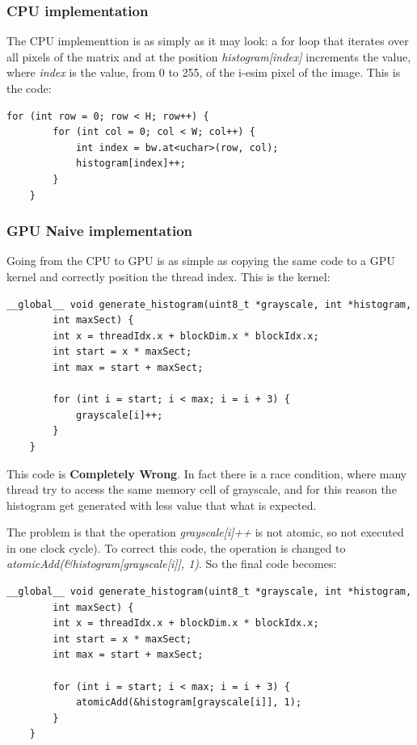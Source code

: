 \documentclass[paper=a4, fontsize=10pt]{scrartcl}	%
\begin{document}
	\subsubsection{CPU implementation}

	The CPU implementtion is as simply as it may look: a for loop that iterates over all pixels of the matrix and at the position \textit{histogram[index]} increments the value, where \textit{index} is the value, from 0 to 255, of the i-esim pixel of the image.
	This is the code:
	
	\begin{lstlisting}[style=CStyle]
	for (int row = 0; row < H; row++) {
		for (int col = 0; col < W; col++) {
			int index = bw.at<uchar>(row, col);
			histogram[index]++;
		}
	}
	\end{lstlisting}
	
	
	\subsubsection{GPU Naive implementation}
	
	Going from the CPU to GPU is as simple as copying the same code to a GPU kernel and correctly position the thread index. This is the kernel:
	
	\begin{lstlisting}[style=CStyle]
	__global__ void generate_histogram(uint8_t *grayscale, int *histogram, 
		int maxSect) {
		int x = threadIdx.x + blockDim.x * blockIdx.x;
		int start = x * maxSect;
		int max = start + maxSect;
	
		for (int i = start; i < max; i = i + 3) {
			grayscale[i]++;
		}
	}
	\end{lstlisting}

	This code is \textbf{Completely Wrong}. In fact there is a race condition, where many thread try to access the same memory cell of grayscale, and for this reason the histogram get generated with less value that what is expected.

	The problem is that the operation \textit{grayscale[i]++} is not atomic, so not executed in one clock cycle). To correct this code, the operation is changed to \textit{atomicAdd(\&histogram[grayscale[i]], 1)}. So the final code becomes:

	\begin{lstlisting}[style=CStyle]
	__global__ void generate_histogram(uint8_t *grayscale, int *histogram, 
		int maxSect) {
		int x = threadIdx.x + blockDim.x * blockIdx.x;
		int start = x * maxSect;
		int max = start + maxSect;
	
		for (int i = start; i < max; i = i + 3) {
	        atomicAdd(&histogram[grayscale[i]], 1);
		}
	}
	\end{lstlisting}
\end{document}
